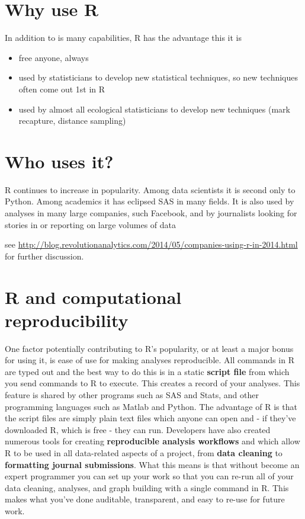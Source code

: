 \documentclass[
]{book}
\providecommand{\tightlist}{%
  \setlength{\itemsep}{0pt}\setlength{\parskip}{0pt}}
\begin{document}
\hypertarget{why-use-r}{%
\section{Why use R}\label{why-use-r}}

In addition to is many capabilities, R has the advantage this it is

\begin{itemize}
\tightlist
\item
  free anyone, always
\item
  used by statisticians to develop new statistical techniques, so new techniques often come out 1st in R
\item
  used by almost all ecological statisticians to develop new techniques (mark recapture, distance sampling)
\end{itemize}

\hypertarget{who-uses-it}{%
\section{Who uses it?}\label{who-uses-it}}

R continues to increase in popularity. Among data scientists it is second only to Python. Among academics it has eclipsed SAS in many fields. It is also used by analyses in many large companies, such Facebook, and by journalists looking for stories in or reporting on large volumes of data

see \url{http://blog.revolutionanalytics.com/2014/05/companies-using-r-in-2014.html} for further discussion.

\hypertarget{r-and-computational-reproducibility}{%
\section{R and computational reproducibility}\label{r-and-computational-reproducibility}}

One factor potentially contributing to R's popularity, or at least a major bonus for using it, is ease of use for making analyses reproducible. All commands in R are typed out and the best way to do this is in a static \textbf{script file} from which you send commands to R to execute. This creates a record of your analyses. This feature is shared by other programs such as SAS and Stats, and other programming languages such as Matlab and Python. The advantage of R is that the script files are simply plain text files which anyone can open and - if they've downloaded R, which is free - they can run. Developers have also created numerous tools for creating \textbf{reproducible analysis workflows} and which allow R to be used in all data-related aspects of a project, from \textbf{data cleaning} to \textbf{formatting journal submissions}. What this means is that without become an expert programmer you can set up your work so that you can re-run all of your data cleaning, analyses, and graph building with a single command in R. This makes what you've done auditable, transparent, and easy to re-use for future work.
\end{document}
